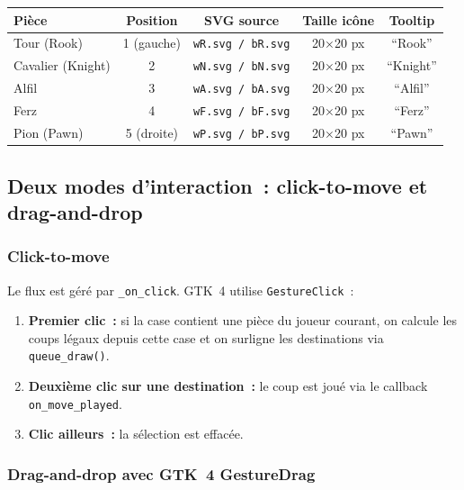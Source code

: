 \documentclass[a4paper,11pt]{article}
\begin{document}
\begin{center}
\renewcommand{\arraystretch}{1.3}
\begin{tabular}{lcccc}
\toprule
\textbf{Pièce} & \textbf{Position} & \textbf{SVG source} & \textbf{Taille icône} & \textbf{Tooltip} \\
\midrule
Tour  (Rook)   & 1 (gauche) & \texttt{wR.svg / bR.svg} & 20×20 px & ``Rook''   \\
Cavalier (Knight) & 2        & \texttt{wN.svg / bN.svg} & 20×20 px & ``Knight'' \\
Alfil          & 3          & \texttt{wA.svg / bA.svg} & 20×20 px & ``Alfil''  \\
Ferz           & 4          & \texttt{wF.svg / bF.svg} & 20×20 px & ``Ferz''   \\
Pion  (Pawn)   & 5 (droite) & \texttt{wP.svg / bP.svg} & 20×20 px & ``Pawn''   \\
\bottomrule
\end{tabular}
\end{center}

\subsection{Deux modes d'interaction~: click-to-move et drag-and-drop}

\subsubsection{Click-to-move}

Le flux est géré par \texttt{\_on\_click}. GTK~4 utilise
\texttt{GestureClick}~:

\begin{enumerate}[noitemsep]
  \item \textbf{Premier clic~:} si la case contient une pièce du joueur
    courant, on calcule les coups légaux depuis cette case et on surligne
    les destinations via \texttt{queue\_draw()}.
  \item \textbf{Deuxième clic sur une destination~:} le coup est joué via
    le callback \texttt{on\_move\_played}.
  \item \textbf{Clic ailleurs~:} la sélection est effacée.
\end{enumerate}

\subsubsection{Drag-and-drop avec GTK~4 GestureDrag}
\end{document}
